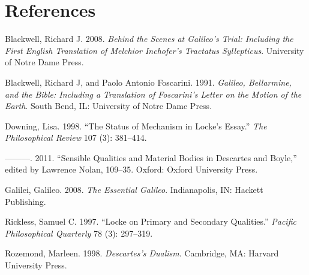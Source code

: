 \documentclass[12pt]{article}
\begin{document}
\section*{References}
\label{sec:orgc73138d}
\begin{hangparas}{1.5em}{1}
\hypertarget{citeproc_bib_item_1}{Blackwell, Richard J. 2008. \textit{Behind the Scenes at Galileo’s Trial: Including the First English Translation of Melchior Inchofer’s Tractatus Syllepticus}. University of Notre Dame Press.}

\hypertarget{citeproc_bib_item_2}{Blackwell, Richard J, and Paolo Antonio Foscarini. 1991. \textit{Galileo, Bellarmine, and the Bible: Including a Translation of Foscarini’s Letter on the Motion of the Earth}. South Bend, IL: University of Notre Dame Press.}

\hypertarget{citeproc_bib_item_3}{Downing, Lisa. 1998. “The Status of Mechanism in Locke’s Essay.” \textit{The Philosophical Review} 107 (3): 381–414.}

\hypertarget{citeproc_bib_item_4}{———. 2011. “Sensible Qualities and Material Bodies in Descartes and Boyle,” edited by Lawrence Nolan, 109–35. Oxford: Oxford University Press.}

\hypertarget{citeproc_bib_item_5}{Galilei, Galileo. 2008. \textit{The Essential Galileo}. Indianapolis, IN: Hackett Publishing.}

\hypertarget{citeproc_bib_item_6}{Rickless, Samuel C. 1997. “Locke on Primary and Secondary Qualities.” \textit{Pacific Philosophical Quarterly} 78 (3): 297–319.}

\hypertarget{citeproc_bib_item_7}{Rozemond, Marleen. 1998. \textit{Descartes’s Dualism}. Cambridge, MA: Harvard University Press.}
\end{hangparas}
\end{document}
